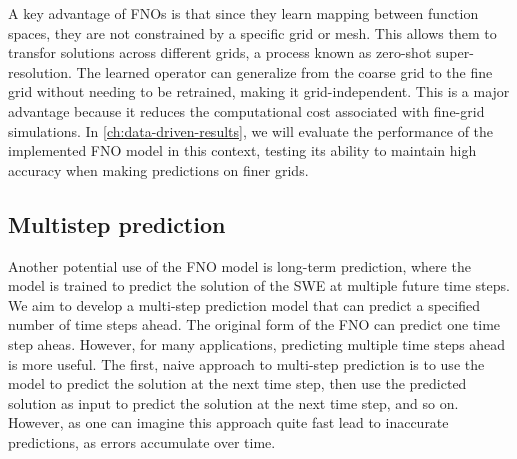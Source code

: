 A key advantage of FNOs is that since they learn mapping between function spaces, they are not constrained by a specific grid or mesh.
This allows them to transfor solutions across different grids, a process known as zero-shot super-resolution.
The learned operator can generalize from the coarse grid to the fine grid without needing to be retrained, making it grid-independent.
This is a major advantage because it reduces the computational cost associated with fine-grid simulations.
In \autoref{ch:data-driven-results}, we will evaluate the performance of the implemented FNO model in this context, testing its ability to maintain high accuracy when making predictions on finer grids.

\subsection*{Multistep prediction}
Another potential use of the FNO model is long-term prediction, where the model is trained to predict the solution of the SWE at multiple future time steps.
We aim to develop a multi-step prediction model that can predict a specified number of time steps ahead.
The original form of the FNO can predict one time step aheas.
However, for many applications, predicting multiple time steps ahead is more useful.
The first, naive approach to multi-step prediction is to use the model to predict the solution at the next time step, then use the predicted solution as input to predict the solution at the next time step, and so on.
However, as one can imagine this approach quite fast lead to inaccurate predictions, as errors accumulate over time.

